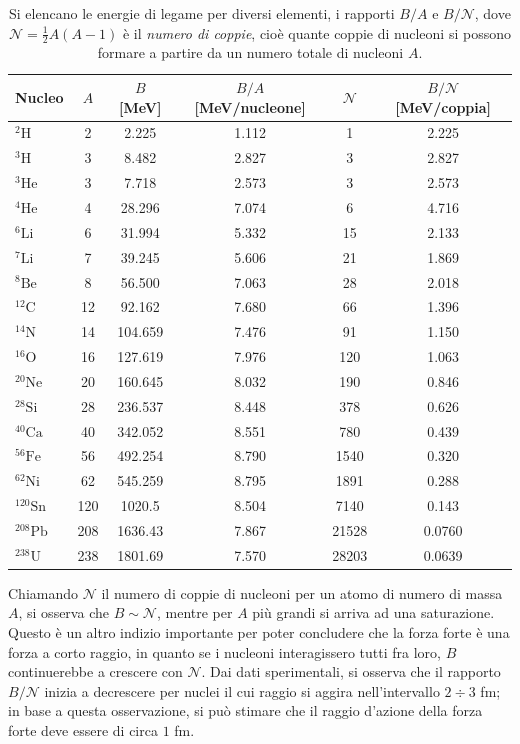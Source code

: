 \documentclass[11pt, a4paper]{scrartcl}
\theoremstyle{style}
\numberwithin{equation}{subsection}
\begin{document}
\begin{table}[htbp]
\centering
\begin{tabular}{lccccc}
\toprule
Nucleo &
$A$ &
$B$ [MeV] &
$B/A$ [MeV/nucleone] &
$\mathcal{N}$ &
$B/\mathcal{N}$ [MeV/coppia]
\\
\midrule
${}^{2}\mathrm{H}$   & 2   & 2.225   & 1.112 & 1     & 2.225 \\
${}^{3}\mathrm{H}$   & 3   & 8.482   & 2.827 & 3     & 2.827 \\
${}^{3}\mathrm{He}$  & 3   & 7.718   & 2.573 & 3     & 2.573 \\
${}^{4}\mathrm{He}$  & 4   & 28.296  & 7.074 & 6     & 4.716 \\
${}^{6}\mathrm{Li}$  & 6   & 31.994  & 5.332 & 15    & 2.133 \\
${}^{7}\mathrm{Li}$  & 7   & 39.245  & 5.606 & 21    & 1.869 \\
${}^{8}\mathrm{Be}$  & 8   & 56.500  & 7.063 & 28    & 2.018 \\
${}^{12}\mathrm{C}$  & 12  & 92.162  & 7.680 & 66    & 1.396 \\
${}^{14}\mathrm{N}$  & 14  & 104.659 & 7.476 & 91    & 1.150 \\
${}^{16}\mathrm{O}$  & 16  & 127.619 & 7.976 & 120   & 1.063 \\
${}^{20}\mathrm{Ne}$ & 20  & 160.645 & 8.032 & 190   & 0.846 \\
${}^{28}\mathrm{Si}$ & 28  & 236.537 & 8.448 & 378   & 0.626 \\
${}^{40}\mathrm{Ca}$ & 40  & 342.052 & 8.551 & 780   & 0.439 \\
${}^{56}\mathrm{Fe}$ & 56  & 492.254 & 8.790 & 1540  & 0.320 \\
${}^{62}\mathrm{Ni}$ & 62  & 545.259 & 8.795 & 1891  & 0.288 \\
${}^{120}\mathrm{Sn}$& 120 & 1020.5  & 8.504 & 7140  & 0.143 \\
${}^{208}\mathrm{Pb}$& 208 & 1636.43 & 7.867 & 21528 & 0.0760 \\
${}^{238}\mathrm{U}$ & 238 & 1801.69 & 7.570 & 28203 & 0.0639 \\
\bottomrule
\end{tabular}
\caption{Si elencano le energie di legame per diversi elementi, i rapporti $B / A$ e $B / \mathcal{N} $, dove $\mathcal{N} = \frac{1}{2} A(A-1) $ \`e il \textit{numero di coppie}, cio\`e quante coppie di nucleoni si possono formare a partire da un numero totale di nucleoni $A$.}
\end{table}
Chiamando $\mathcal{N} $ il numero di coppie di nucleoni per un atomo di numero di massa $A$, si osserva che $B\sim \mathcal{N}$, mentre per $A$ pi\`u grandi si arriva ad una saturazione. 
Questo \`e un altro indizio importante per poter concludere che la forza forte \`e una forza a corto raggio, in quanto se i nucleoni interagissero tutti fra loro, $B $ continuerebbe a crescere con $\mathcal{N} $.
	Dai dati sperimentali, si osserva che il rapporto $B / \mathcal{N} $ inizia a decrescere per nuclei il cui raggio si aggira nell'intervallo $2\div 3$ fm; in base a questa osservazione, si pu\`o stimare che il raggio d'azione della forza forte deve essere di circa $1$ fm.
\end{document}
